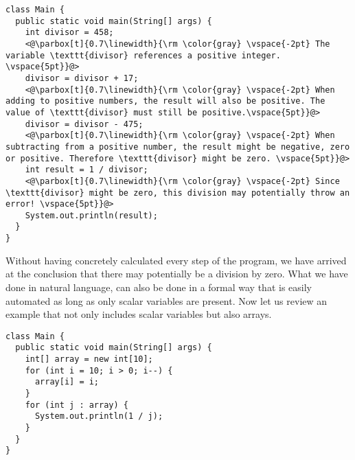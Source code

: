 \vspace{2mm}

\begin{adjustbox}{center}
\begin{lstlisting}
class Main {
  public static void main(String[] args) {
    int divisor = 458;
    <@\parbox[t]{0.7\linewidth}{\rm \color{gray} \vspace{-2pt} The variable \texttt{divisor} references a positive integer. \vspace{5pt}}@>
    divisor = divisor + 17;
    <@\parbox[t]{0.7\linewidth}{\rm \color{gray} \vspace{-2pt} When adding to positive numbers, the result will also be positive. The value of \texttt{divisor} must still be positive.\vspace{5pt}}@>
    divisor = divisor - 475;
    <@\parbox[t]{0.7\linewidth}{\rm \color{gray} \vspace{-2pt} When subtracting from a positive number, the result might be negative, zero or positive. Therefore \texttt{divisor} might be zero. \vspace{5pt}}@>
    int result = 1 / divisor;
    <@\parbox[t]{0.7\linewidth}{\rm \color{gray} \vspace{-2pt} Since \texttt{divisor} might be zero, this division may potentially throw an error! \vspace{5pt}}@>
    System.out.println(result);
  }
}
\end{lstlisting}
\end{adjustbox}
\vspace{2mm}

\noindent Without having concretely calculated every step of the program, we have arrived at the conclusion that there may potentially be a division by zero. What we have done in natural language, can also be done in a formal way that is easily automated \cite{cousot1977} as long as only scalar variables are present. Now let us review an example that not only includes scalar variables but also arrays.


\vspace{2mm}

\begin{adjustbox}{center}
\begin{lstlisting}
class Main {
  public static void main(String[] args) {
    int[] array = new int[10];
    for (int i = 10; i > 0; i--) {
      array[i] = i;
    }
    for (int j : array) {
      System.out.println(1 / j);
    }
  }
}
\end{lstlisting}
\end{adjustbox}
\vspace{2mm}


